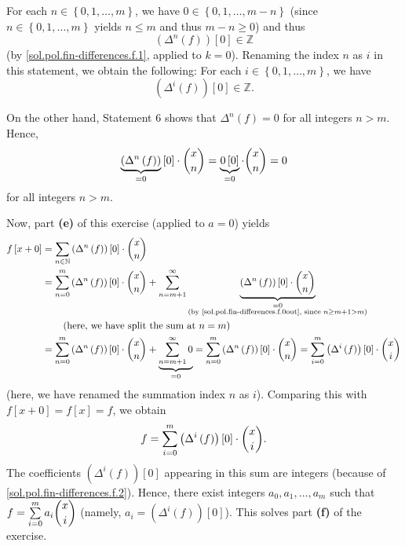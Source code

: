 \documentclass[paper=a4, fontsize=12pt]{scrartcl}%
\let\sumnonlimits\sum
\renewcommand{\sum}{\sumnonlimits\limits}
\theoremstyle{plainsl}
\theoremstyle{definition}
\theoremstyle{remark}
\begin{document}
For each $n\in\left\{  0,1,\ldots,m\right\}  $, we have $0\in\left\{
0,1,\ldots,m-n\right\}  $ (since $n\in\left\{  0,1,\ldots,m\right\}  $ yields
$n\leq m$ and thus $m-n\geq0$) and thus%
\[
\left(  \Delta^{n}\left(  f\right)  \right)  \left[  0\right]  \in\mathbb{Z}%
\]
(by \eqref{sol.pol.fin-differences.f.1}, applied to $k=0$). Renaming the index
$n$ as $i$ in this statement, we obtain the following: For each $i\in\left\{
0,1,\ldots,m\right\}  $, we have%
\begin{equation}
\left(  \Delta^{i}\left(  f\right)  \right)  \left[  0\right]  \in\mathbb{Z}.
\label{sol.pol.fin-differences.f.2}%
\end{equation}


On the other hand, Statement 6 shows that $\Delta^{n}\left(  f\right)  =0$ for
all integers $n>m$. Hence,
\begin{equation}
\underbrace{\left(  \Delta^{n}\left(  f\right)  \right)  }_{=0}\left[
0\right]  \cdot\dbinom{x}{n}=\underbrace{0\left[  0\right]  }_{=0}\cdot
\dbinom{x}{n}=0 \label{sol.pol.fin-differences.f.0out}%
\end{equation}
for all integers $n>m$.

Now, part \textbf{(e)} of this exercise (applied to $a=0$) yields%
\begin{align*}
f\left[  x+0\right]   &  =\sum_{n\in\mathbb{N}}\left(  \Delta^{n}\left(
f\right)  \right)  \left[  0\right]  \cdot\dbinom{x}{n}\\
&  =\sum_{n=0}^{m}\left(  \Delta^{n}\left(  f\right)  \right)  \left[
0\right]  \cdot\dbinom{x}{n}+\sum_{n=m+1}^{\infty}\underbrace{\left(
\Delta^{n}\left(  f\right)  \right)  \left[  0\right]  \cdot\dbinom{x}{n}%
}_{\substack{=0\\\text{(by \eqref{sol.pol.fin-differences.f.0out}, since
}n\geq m+1>m\text{)}}}\\
&  \qquad\left(  \text{here, we have split the sum at }n=m\right) \\
&  =\sum_{n=0}^{m}\left(  \Delta^{n}\left(  f\right)  \right)  \left[
0\right]  \cdot\dbinom{x}{n}+\underbrace{\sum_{n=m+1}^{\infty}0}_{=0}%
=\sum_{n=0}^{m}\left(  \Delta^{n}\left(  f\right)  \right)  \left[  0\right]
\cdot\dbinom{x}{n}=\sum_{i=0}^{m}\left(  \Delta^{i}\left(  f\right)  \right)
\left[  0\right]  \cdot\dbinom{x}{i}%
\end{align*}
(here, we have renamed the summation index $n$ as $i$). Comparing this with
$f\left[  x+0\right]  =f\left[  x\right]  =f$, we obtain%
\[
f=\sum_{i=0}^{m}\left(  \Delta^{i}\left(  f\right)  \right)  \left[  0\right]
\cdot\dbinom{x}{i}.
\]
The coefficients $\left(  \Delta^{i}\left(  f\right)  \right)  \left[
0\right]  $ appearing in this sum are integers (because of
\eqref{sol.pol.fin-differences.f.2}). Hence, there exist integers $a_{0}%
,a_{1},\ldots,a_{m}$ such that $f=\sum_{i=0}^{m}a_{i}\dbinom{x}{i}$ (namely,
$a_{i}=\left(  \Delta^{i}\left(  f\right)  \right)  \left[  0\right]  $). This
solves part \textbf{(f)} of the exercise.
\end{document}
